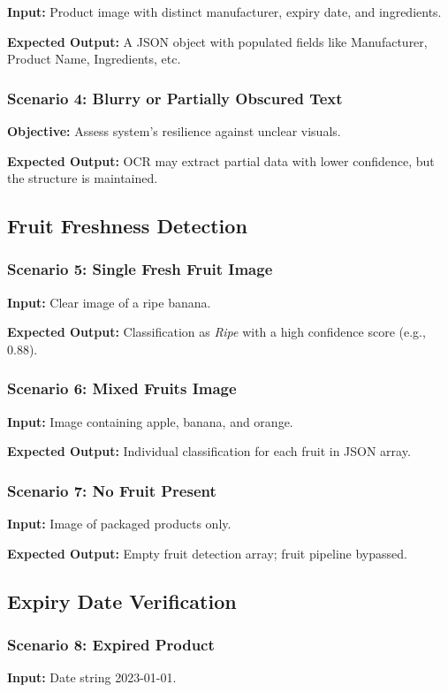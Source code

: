 \documentclass[12pt]{report}
\begin{document}
\textbf{Input:} Product image with distinct manufacturer, expiry date, and ingredients.

\textbf{Expected Output:} A JSON object with populated fields like Manufacturer, Product Name, Ingredients, etc.

\subsubsection{Scenario 4: Blurry or Partially Obscured Text}
\textbf{Objective:} Assess system's resilience against unclear visuals.

\textbf{Expected Output:} OCR may extract partial data with lower confidence, but the structure is maintained.

\subsection{Fruit Freshness Detection}

\subsubsection{Scenario 5: Single Fresh Fruit Image}
\textbf{Input:} Clear image of a ripe banana.

\textbf{Expected Output:} Classification as \textit{Ripe} with a high confidence score (e.g., 0.88).

\subsubsection{Scenario 6: Mixed Fruits Image}
\textbf{Input:} Image containing apple, banana, and orange.

\textbf{Expected Output:} Individual classification for each fruit in JSON array.

\subsubsection{Scenario 7: No Fruit Present}
\textbf{Input:} Image of packaged products only.

\textbf{Expected Output:} Empty fruit detection array; fruit pipeline bypassed.

\subsection{Expiry Date Verification}

\subsubsection{Scenario 8: Expired Product}
\textbf{Input:} Date string 2023-01-01.
\end{document}
